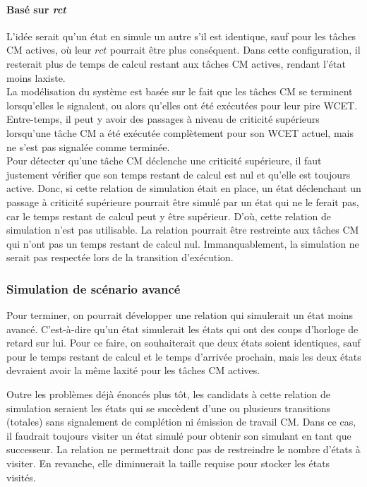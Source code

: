 \documentclass[12pt,a4paper,oneside]{book}
\theoremstyle{break}
\theoremstyle{breakplain}
\begin{document}
\paragraph{Basé sur \textit{rct}}
L'idée serait qu’un état en simule un autre s'il est identique, sauf pour les tâches CM actives, où leur $rct$ pourrait être plus conséquent. Dans cette configuration, il resterait plus de temps de calcul restant aux tâches CM actives, rendant l'état moins laxiste.\\

La modélisation du système est basée sur le fait que les tâches CM se terminent lorsqu'elles le signalent, ou alors qu'elles ont été exécutées pour leur pire WCET. Entre-temps, il peut y avoir des passages à niveau de criticité supérieurs lorsqu'une tâche CM a été exécutée complètement pour son WCET actuel, mais ne s'est pas signalée comme terminée.\\
Pour détecter qu'une tâche CM déclenche une criticité supérieure, il faut justement vérifier que son temps restant de calcul est nul et qu'elle est toujours active. Donc, si cette relation de simulation était en place, un état déclenchant un passage à criticité supérieure pourrait être simulé par un état qui ne le ferait pas, car le temps restant de calcul peut y être supérieur. D'où, cette relation de simulation n'est pas utilisable.
La relation pourrait être restreinte aux tâches CM qui n'ont pas un temps restant de calcul nul. Immanquablement, la simulation ne serait pas respectée lors de la transition d'exécution.

\subsubsection{Simulation de scénario avancé}
Pour terminer, on pourrait développer une relation qui simulerait un état moins avancé. C'est-à-dire qu'un état simulerait les états qui ont des coups d'horloge de retard sur lui. Pour ce faire, on souhaiterait que deux états soient identiques, sauf pour le temps restant de calcul et le temps d'arrivée prochain, mais les deux états devraient avoir la même laxité pour les tâches CM actives.\\

\pagebreak

Outre les problèmes déjà énoncés plus tôt, les candidats à cette relation de simulation seraient les états qui se succèdent d'une ou plusieurs transitions (totales) sans signalement de complétion ni émission de travail CM. Dans ce cas, il faudrait toujours visiter un état simulé pour obtenir son simulant en tant que successeur. La relation ne permettrait donc pas de restreindre le nombre d'états à visiter. En revanche, elle diminuerait la taille requise pour stocker les états visités.
\end{document}

